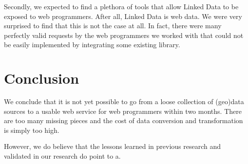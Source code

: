 \documentclass[a4paper]{scrartcl}
\begin{document}
Secondly, we expected to find a plethora of tools that allow Linked
Data to be exposed to web programmers.  After all, Linked Data is web
data.  We were very surprised to find that this is not the case at
all.  In fact, there were many perfectly valid requests by the web
programmers we worked with that could not be easily implemented by
integrating some existing library.


\section{Conclusion}

We conclude that it is not yet possible to go from a loose collection
of (geo)data sources to a usable web service for web programmers
within two months.  There are too many missing pieces and the cost of
data conversion and transformation is simply too high.

However, we do believe that the lessons learned in previous research
and validated in our research do point to a.







\end{document}
